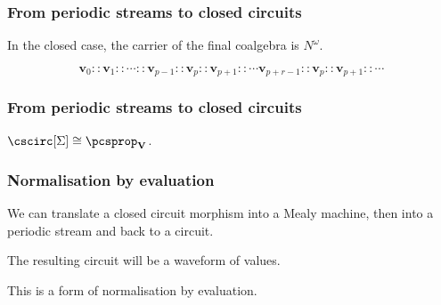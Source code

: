 \begin{frame}
    \frametitle{From periodic streams to closed circuits}

    In the \alert{closed} case, the carrier of the final coalgebra is $N^\omega$.

    \pause

    \[ \textbf{v}_0 :: \textbf{v}_1 :: \cdots :: \textbf{v}_{p-1} :: \textbf{v}_{p} :: \textbf{v}_{p+1} :: \cdots \textbf{v}_{p+r-1} :: \textbf{v}_{p} :: \textbf{v}_{p+1} :: \cdots\]

    \pause

    \begin{center}
    \end{center}

\end{frame}

\begin{frame}
    \frametitle{From periodic streams to closed circuits}
        \pause

        \begin{center}

            \pause

            \vspace{1em}

        \end{center}
    
        \vspace{1em}

        \pause

        \begin{theorem}
            $\cscirc[\Sigma] \cong {\pcsprop}_{\textbf{V}}$.
        \end{theorem}
\end{frame}

\begin{frame}
    \frametitle{Normalisation by evaluation}

    \pause

    We can translate a closed circuit morphism into a Mealy machine, then into a periodic stream and back to a circuit.

    \pause

    The resulting circuit will be a \alert{waveform} of values.
    
    \pause

    This is a form of \alert{normalisation by evaluation}.

\end{frame}